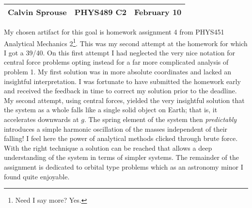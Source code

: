 \documentclass[a4paper, 12pt]{config/homework}
\begin{document}
\noindent
\begin{tabularx}{\textwidth}{>{\centering\arraybackslash}X>{\centering\arraybackslash}X>{\centering\arraybackslash}X}
Calvin Sprouse & PHYS489 C2 & 2024 February 10\\
\midrule
\end{tabularx}



My chosen artifact for this goal is homework assignment 4 from PHYS451 Analytical Mechanics 2\footnote{Need I say more? Yes.}. This was my second attempt at the homework for which I got a 39/40. On this first attempt I had neglected the very nice notation for central force problems opting instead for a far more complicated analysis of problem 1. My first solution was in more absolute coordinates and lacked an insightful interpretation. I was fortunate to have submitted the homework early and received the feedback in time to correct my solution prior to the deadline. My second attempt, using central forces, yielded the very insightful solution that the system as a whole falls like a single solid object on Earth; that is, it accelerates downwards at \(g\). The spring element of the system then \textit{predictably} introduces a simple harmonic oscillation of the masses independent of their falling! I feel here the power of analytical methods clicked through brute force. With the right technique a solution can be reached that allows a deep understanding of the system in terms of simpler systems. The remainder of the assignment is dedicated to orbital type problems which as an astronomy minor I found quite enjoyable.


\end{document}
